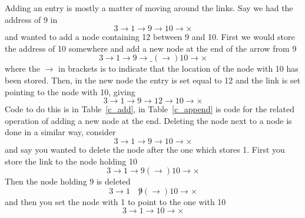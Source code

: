 \documentclass[11pt,a4paper]{scrartcl}
\begin{document}
Adding an entry is mostly a matter of moving around the links. Say we
had the address of 9 in
\begin{equation}
3\rightarrow 1\rightarrow 9\rightarrow 10\rightarrow \times
\end{equation}
 and wanted to add a node containing 12 between 9 and 10. First we would store the address of 10 somewhere and add a new node at the end of the arrow from 9
\begin{equation}
3\rightarrow 1\rightarrow 9\rightarrow \_(\rightarrow)10\rightarrow \times
\end{equation}
where the $\rightarrow$ in brackets is to indicate that the location
of the node with 10 has been stored. Then, in the new node the entry
is set equal to 12 and the link is set pointing to the node with 10, giving
\begin{equation}
3\rightarrow 1\rightarrow 9\rightarrow 12\rightarrow 10\rightarrow \times
\end{equation}
Code to do this is in Table~\ref{c_add}, in Table~\ref{c_append} is
code for the related operation of adding a new node at the end. Deleting the node next to a node is done in a similar way, consider
\begin{equation}
3\rightarrow 1\rightarrow 9\rightarrow 10\rightarrow \times
\end{equation}
and say you wanted to delete the node after the one which stores 1. First you store the link to the node holding 10
\begin{equation}
3\rightarrow 1\rightarrow 9(\rightarrow) 10\rightarrow \times
\end{equation}
Then the node holding 9 is deleted
\begin{equation}
3\rightarrow 1\quad \not9(\rightarrow) 10\rightarrow \times
\end{equation}
and then you set the node with 1 to point to the one with 10
\begin{equation}
3\rightarrow 1\rightarrow 10\rightarrow \times
\end{equation}
\end{document}
